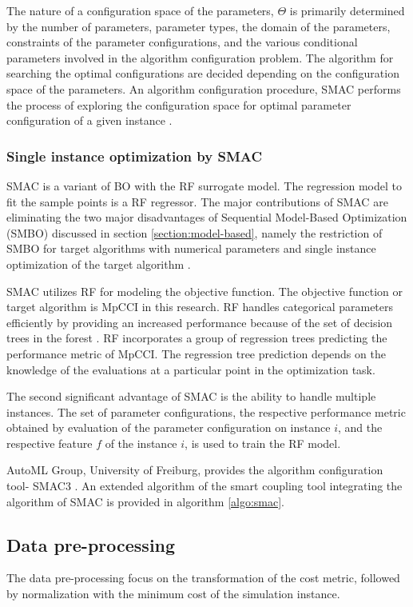 The nature of a configuration space of the parameters, $\Theta$ is primarily determined by the number of parameters, parameter types, the domain of the parameters, constraints of the parameter configurations, and the various conditional parameters involved in the algorithm configuration problem. The algorithm for searching the optimal configurations are decided depending on the configuration space of the parameters. An algorithm configuration procedure, SMAC performs the process of exploring the configuration space for optimal parameter configuration of a given instance \cite{Hutterphd}. 

\subsubsection{Single instance optimization by SMAC}
\label{section:smac}
SMAC is a variant of BO with the RF surrogate model. The regression model to fit the sample points is a RF regressor. The major contributions of SMAC are eliminating the two major disadvantages of Sequential Model-Based Optimization (SMBO) discussed in section \ref{section:model-based}, namely the restriction of SMBO for target algorithms with numerical parameters and single instance optimization of the target algorithm \cite{SMAC_mainpaper}.

SMAC utilizes RF for modeling the objective function. The objective function or target algorithm is MpCCI in this research. RF handles categorical parameters efficiently \cite{Hutterphd} by providing an increased performance because of the set of decision trees in the forest \cite{SMAC_mainpaper} \cite{RF_mainpaper}. RF incorporates a group of regression trees predicting the performance metric of MpCCI. The regression tree prediction depends on the knowledge of the evaluations at a particular point in the optimization task.

The second significant advantage of SMAC is the ability to handle multiple instances. The set of parameter configurations, the respective performance metric obtained by evaluation of the parameter configuration on instance $i$, and the respective feature $f$ of the instance $i$, is used to train the RF model.

AutoML Group, University of Freiburg, provides the algorithm configuration tool- SMAC3 \cite{smac-github}. An extended algorithm of the smart coupling tool integrating the algorithm of SMAC is provided in algorithm \ref{algo:smac}. 

\subsection{Data pre-processing}
\label{section:data_preprocessing}
The data pre-processing focus on the transformation of the cost metric, followed by normalization with the minimum cost of the simulation instance.

